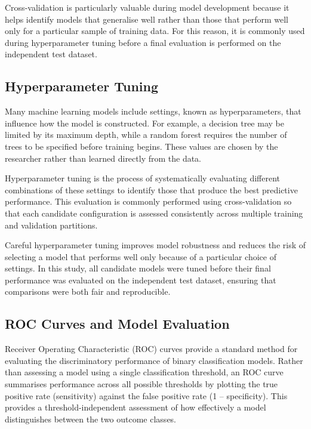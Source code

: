 Cross-validation is particularly valuable during model development because it helps identify models that generalise well rather than those that perform well 
only for a particular sample of training data. For this reason, it is commonly used during hyperparameter tuning before a final evaluation is performed on the 
independent test dataset.

\subsection{Hyperparameter Tuning}

Many machine learning models include settings, known as hyperparameters, that influence how the model is constructed. For example, a decision tree may be limited by its 
maximum depth, while a random forest requires the number of trees to be specified before training begins. These values are chosen by the researcher rather than learned 
directly from the data.

Hyperparameter tuning is the process of systematically evaluating different combinations of these settings to identify those that produce the best predictive performance. 
This evaluation is commonly performed using cross-validation so that each candidate configuration is assessed consistently across multiple training and validation partitions.

Careful hyperparameter tuning improves model robustness and reduces the risk of selecting a model that performs well only because of a particular choice of settings. 
In this study, all candidate models were tuned before their final performance was evaluated on the independent test dataset, ensuring that comparisons were both fair and 
reproducible.


\subsection{ROC Curves and Model Evaluation}

Receiver Operating Characteristic (ROC) curves provide a standard method for evaluating the discriminatory performance of binary classification models. Rather than 
assessing a model using a single classification threshold, an ROC curve summarises performance across all possible thresholds by plotting the true positive rate (sensitivity) 
against the false positive rate (1 -- specificity). This provides a threshold-independent assessment of how effectively a model distinguishes between the two outcome classes.

